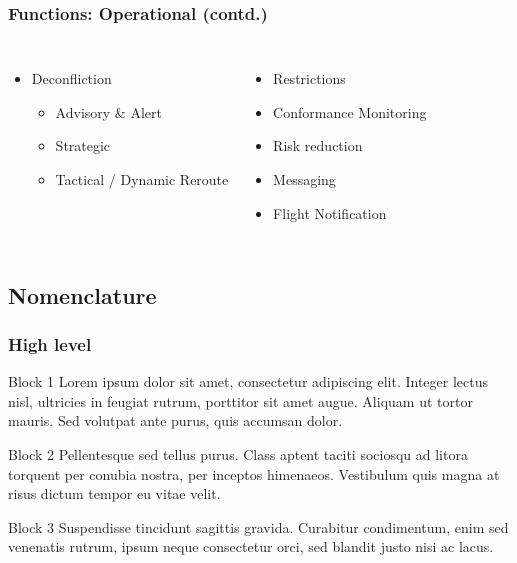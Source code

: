 \documentclass[usenames,dvipsnames,aspectratio=169,serif]{beamer}
\begin{document}
\begin{frame}
\frametitle{Functions: Operational (contd.)}
\begin{columns}[c] %

\begin{itemize}
\item Deconfliction
\begin{itemize}
\item Advisory \& Alert
\item Strategic
\item Tactical / Dynamic Reroute
\end{itemize}
\end{itemize}

\begin{itemize}
\item Restrictions
\item Conformance Monitoring
\item Risk reduction
\item Messaging
\item Flight Notification
\end{itemize}
\end{columns}

\end{frame}

\subsection{Nomenclature}

\begin{frame}
\frametitle{High level}
\begin{block}{Block 1}
Lorem ipsum dolor sit amet, consectetur adipiscing elit. Integer lectus nisl, ultricies in feugiat rutrum, porttitor sit amet augue. Aliquam ut tortor mauris. Sed volutpat ante purus, quis accumsan dolor.
\end{block}

\begin{block}{Block 2}
Pellentesque sed tellus purus. Class aptent taciti sociosqu ad litora torquent per conubia nostra, per inceptos himenaeos. Vestibulum quis magna at risus dictum tempor eu vitae velit.
\end{block}

\begin{block}{Block 3}
Suspendisse tincidunt sagittis gravida. Curabitur condimentum, enim sed venenatis rutrum, ipsum neque consectetur orci, sed blandit justo nisi ac lacus.
\end{block}
\end{frame}
\end{document}
